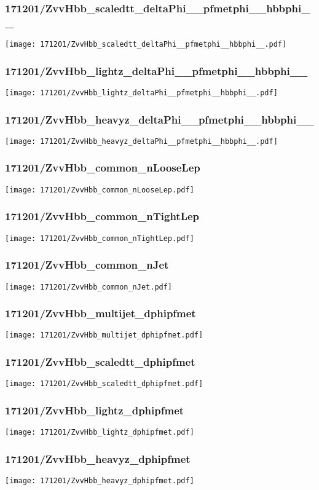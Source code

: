 \begin{frame}
   \frametitle{\small 171201/ZvvHbb\_scaledtt\_deltaPhi\_\_pfmetphi\_\_hbbphi\_\_}
   \centering
   \texttt{[image: 171201/ZvvHbb\_scaledtt\_deltaPhi\_\_pfmetphi\_\_hbbphi\_\_.pdf]}
\end{frame}

\begin{frame}
   \frametitle{\small 171201/ZvvHbb\_lightz\_deltaPhi\_\_pfmetphi\_\_hbbphi\_\_}
   \centering
   \texttt{[image: 171201/ZvvHbb\_lightz\_deltaPhi\_\_pfmetphi\_\_hbbphi\_\_.pdf]}
\end{frame}

\begin{frame}
   \frametitle{\small 171201/ZvvHbb\_heavyz\_deltaPhi\_\_pfmetphi\_\_hbbphi\_\_}
   \centering
   \texttt{[image: 171201/ZvvHbb\_heavyz\_deltaPhi\_\_pfmetphi\_\_hbbphi\_\_.pdf]}
\end{frame}

\begin{frame}
   \frametitle{\small 171201/ZvvHbb\_common\_nLooseLep}
   \centering
   \texttt{[image: 171201/ZvvHbb\_common\_nLooseLep.pdf]}
\end{frame}

\begin{frame}
   \frametitle{\small 171201/ZvvHbb\_common\_nTightLep}
   \centering
   \texttt{[image: 171201/ZvvHbb\_common\_nTightLep.pdf]}
\end{frame}

\begin{frame}
   \frametitle{\small 171201/ZvvHbb\_common\_nJet}
   \centering
   \texttt{[image: 171201/ZvvHbb\_common\_nJet.pdf]}
\end{frame}

\begin{frame}
   \frametitle{\small 171201/ZvvHbb\_multijet\_dphipfmet}
   \centering
   \texttt{[image: 171201/ZvvHbb\_multijet\_dphipfmet.pdf]}
\end{frame}

\begin{frame}
   \frametitle{\small 171201/ZvvHbb\_scaledtt\_dphipfmet}
   \centering
   \texttt{[image: 171201/ZvvHbb\_scaledtt\_dphipfmet.pdf]}
\end{frame}

\begin{frame}
   \frametitle{\small 171201/ZvvHbb\_lightz\_dphipfmet}
   \centering
   \texttt{[image: 171201/ZvvHbb\_lightz\_dphipfmet.pdf]}
\end{frame}

\begin{frame}
   \frametitle{\small 171201/ZvvHbb\_heavyz\_dphipfmet}
   \centering
   \texttt{[image: 171201/ZvvHbb\_heavyz\_dphipfmet.pdf]}
\end{frame}

